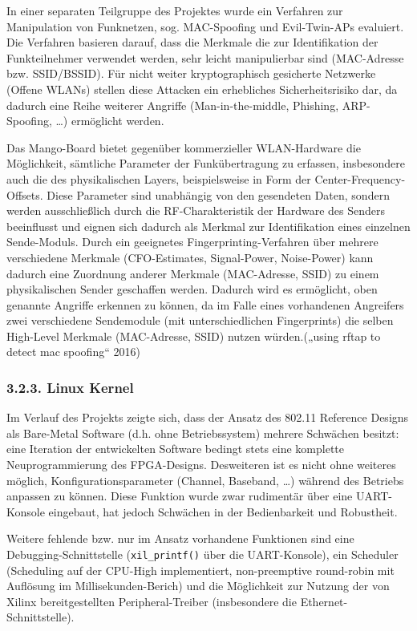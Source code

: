 \documentclass[ngerman,]{scrartcl}
\begin{document}
In einer separaten Teilgruppe des Projektes wurde ein Verfahren zur
Manipulation von Funknetzen, sog. MAC-Spoofing und Evil-Twin-APs
evaluiert. Die Verfahren basieren darauf, dass die Merkmale die zur
Identifikation der Funkteilnehmer verwendet werden, sehr leicht
manipulierbar sind (MAC-Adresse bzw. SSID/BSSID). Für nicht weiter
kryptographisch gesicherte Netzwerke (Offene WLANs) stellen diese
Attacken ein erhebliches Sicherheitsrisiko dar, da dadurch eine Reihe
weiterer Angriffe (Man-in-the-middle, Phishing, ARP-Spoofing, \ldots{})
ermöglicht werden.

Das Mango-Board bietet gegenüber kommerzieller WLAN-Hardware die
Möglichkeit, sämtliche Parameter der Funkübertragung zu erfassen,
insbesondere auch die des physikalischen Layers, beispielsweise in Form
der Center-Frequency-Offsets. Diese Parameter sind unabhängig von den
gesendeten Daten, sondern werden ausschließlich durch die
RF-Charakteristik der Hardware des Senders beeinflusst und eignen sich
dadurch als Merkmal zur Identifikation eines einzelnen Sende-Moduls.
Durch ein geeignetes Fingerprinting-Verfahren über mehrere verschiedene
Merkmale (CFO-Estimates, Signal-Power, Noise-Power) kann dadurch eine
Zuordnung anderer Merkmale (MAC-Adresse, SSID) zu einem physikalischen
Sender geschaffen werden. Dadurch wird es ermöglicht, oben genannte
Angriffe erkennen zu können, da im Falle eines vorhandenen Angreifers
zwei verschiedene Sendemodule (mit unterschiedlichen Fingerprints) die
selben High-Level Merkmale (MAC-Adresse, SSID) nutzen würden.(„using
rftap to detect mac spoofing`` 2016)

\subsubsection{3.2.3. Linux Kernel}\label{linux-kernel}

Im Verlauf des Projekts zeigte sich, dass der Ansatz des 802.11
Reference Designs als Bare-Metal Software (d.h. ohne Betriebssystem)
mehrere Schwächen besitzt: eine Iteration der entwickelten Software
bedingt stets eine komplette Neuprogrammierung des FPGA-Designs.
Desweiteren ist es nicht ohne weiteres möglich, Konfigurationsparameter
(Channel, Baseband, \ldots{}) während des Betriebs anpassen zu können.
Diese Funktion wurde zwar rudimentär über eine UART-Konsole eingebaut,
hat jedoch Schwächen in der Bedienbarkeit und Robustheit.

Weitere fehlende bzw. nur im Ansatz vorhandene Funktionen sind eine
Debugging-Schnittstelle (\texttt{xil\_printf()} über die UART-Konsole),
ein Scheduler (Scheduling auf der CPU-High implementiert, non-preemptive
round-robin mit Auflösung im Millisekunden-Berich) und die Möglichkeit
zur Nutzung der von Xilinx bereitgestellten Peripheral-Treiber
(insbesondere die Ethernet-Schnittstelle).
\end{document}
